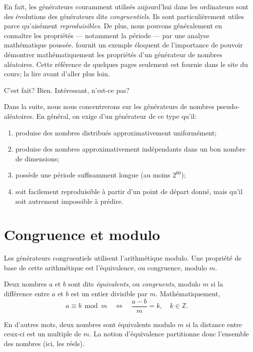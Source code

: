 En fait, les générateurs couramment utilisés aujourd'hui dans les
ordinateurs sont des évolutions des générateurs dits
\emph{congruentiels}. Ils sont particulièrement utiles parce
qu'aisément \emph{reproduisibles}. De plus, nous pouvons généralement
en connaître les propriétés --- notamment la période --- par une
analyse mathématique poussée. \citet[section 3.1]{Knuth:ACP:vol2:1997}
fournit un exemple éloquent de l'importance de pouvoir démontrer
mathématiquement les propriétés d'un générateur de nombres aléatoires.
Cette référence de quelques pages seulement est fournie dans le site
du cours; la lire avant d'aller plus loin.

C'est fait? Bien. Intéressant, n'est-ce pas?

Dans la suite, nous nous concentrerons sur les générateurs de nombres
pseudo-aléatoires. En général, on exige d'un générateur de ce type
qu'il:
\begin{enumerate}
\item produise des nombres distribués approximativement uniformément;
\item produise des nombres approximativement indépendants dans un bon
  nombre de dimensions;
\item possède une période suffisamment longue (au moins $2^{60}$);
\item soit facilement reproduisible à partir d'un point de départ
  donné, mais qu'il soit autrement impossible à prédire.
\end{enumerate}


\section{Congruence et modulo}
\label{sec:generation:congruence}

Les générateurs congruentiels utilisent l'arithmétique modulo. Une
propriété de base de cette arithmétique est l'équivalence, ou
congruence, modulo $m$.

\begin{definition}
  Deux nombres $a$ et $b$ sont dits \emph{équivalents}, ou
  \emph{congruents}, modulo $m$ si la différence entre $a$ et $b$ est
  un entier divisible par $m$. Mathématiquement,
  \begin{equation*}
    a \equiv b \bmod m \quad\Leftrightarrow\quad \frac{a - b}{m} = k, \quad
    k \in \mathbb{Z}.
  \end{equation*}
\end{definition}

En d'autres mots, deux nombres sont équivalents modulo $m$ si la
distance entre ceux-ci est un multiple de $m$. La notion d'équivalence
partitionne donc l'ensemble des nombres (ici, les réels).

